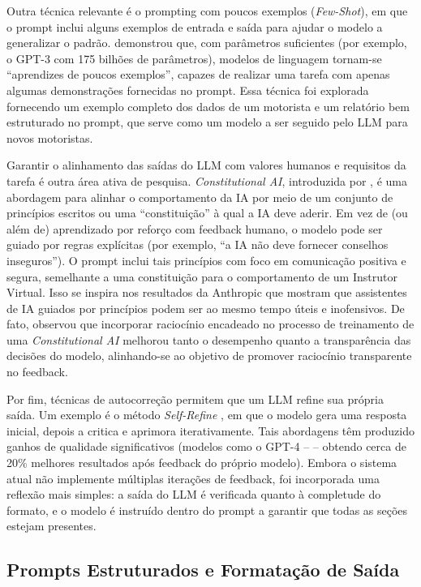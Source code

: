 \documentclass[12pt]{article}
\begin{document}
Outra técnica relevante é o prompting com poucos exemplos (\textit{Few-Shot}), em que o prompt inclui alguns exemplos de entrada e saída para ajudar o modelo a generalizar o padrão. \cite{brown2020} demonstrou que, com parâmetros suficientes (por exemplo, o GPT-3 com 175 bilhões de parâmetros), modelos de linguagem tornam-se “aprendizes de poucos exemplos”, capazes de realizar uma tarefa com apenas algumas demonstrações fornecidas no prompt. Essa técnica foi explorada fornecendo um exemplo completo dos dados de um motorista e um relatório bem estruturado no prompt, que serve como um modelo a ser seguido pelo LLM para novos motoristas.

Garantir o alinhamento das saídas do LLM com valores humanos e requisitos da tarefa é outra área ativa de pesquisa. \textit{Constitutional AI}, introduzida por \cite{anthropic2022}, é uma abordagem para alinhar o comportamento da IA por meio de um conjunto de princípios escritos ou uma “constituição” à qual a IA deve aderir. Em vez de (ou além de) aprendizado por reforço com feedback humano, o modelo pode ser guiado por regras explícitas (por exemplo, “a IA não deve fornecer conselhos inseguros”). O prompt inclui tais princípios com foco em comunicação positiva e segura, semelhante a uma constituição para o comportamento de um Instrutor Virtual. Isso se inspira nos resultados da Anthropic que mostram que assistentes de IA guiados por princípios podem ser ao mesmo tempo úteis e inofensivos. De fato,  \cite{bai2022} observou que incorporar raciocínio encadeado no processo de treinamento de uma \textit{Constitutional AI} melhorou tanto o desempenho quanto a transparência das decisões do modelo, alinhando-se ao objetivo de promover raciocínio transparente no feedback.

Por fim, técnicas de autocorreção permitem que um LLM refine sua própria saída. Um exemplo é o método \textit{Self-Refine} \cite{madaan2023}, em que o modelo gera uma resposta inicial, depois a critica e aprimora iterativamente. Tais abordagens têm produzido ganhos de qualidade significativos (modelos como o GPT-4 – \cite{openai2023} – obtendo cerca de 20\% melhores resultados após feedback do próprio modelo). Embora o sistema atual não implemente múltiplas iterações de feedback, foi incorporada uma reflexão mais simples: a saída do LLM é verificada quanto à completude do formato, e o modelo é instruído dentro do prompt a garantir que todas as seções estejam presentes.

\subsection{Prompts Estruturados e Formatação de Saída}
\end{document}
